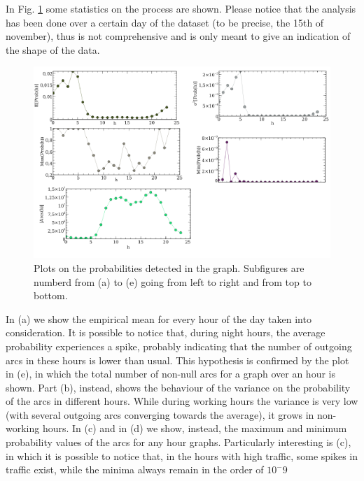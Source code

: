 In Fig. \ref{fig:analysis} some statistics on the process are shown. Please notice that the analysis has been done over 
a certain day of the dataset (to be precise, the 15th of november), thus is not comprehensive and is only meant to give 
an indication of the shape of the data.
\begin{figure}[H]
\centering
\includegraphics{arcsanalysis.png}
\caption{\label{fig:analysis}Plots on the probabilities detected in the graph. Subfigures are numberd from (a) to (e) going from left to right and from top to bottom.}
\end{figure}

In (a) we show the empirical mean for every hour of the day taken into consideration. It is possible to notice that, during
night hours, the average probability experiences a spike, probably indicating that the number of outgoing arcs in these 
hours is lower than usual. This hypothesis is confirmed by the plot in (e), in which the total number of non-null arcs
for a graph over an hour is shown.
Part (b), instead, shows the behaviour of the variance on the probability of the arcs in different hours. While during
working hours the variance is very low (with several outgoing arcs converging towards the average), it grows
in non-working hours.
In (c) and in (d) we show, instead, the maximum and minimum probability values of the arcs for any hour graphs. Particularly interesting
is (c), in which it is possible to notice that, in the hours with high traffic, some spikes in traffic exist, while
the minima always remain in the order of $10^-9$ 
